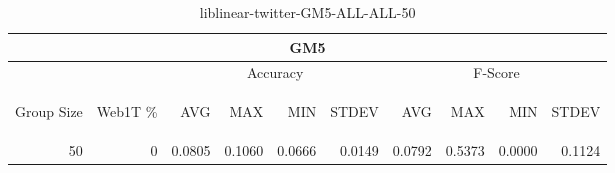 \begin{center}
\begin{table}[htbp] 
 \begin{center}
\begin{tabular}{ | r | r | r | r | r | r | r | r | r | r |}
\hline
\multicolumn{10}{|c|}{GM5}\\
\hline
 & & \multicolumn{4}{|c|}{Accuracy} & \multicolumn{4}{|c|}{F-Score}\\ \cline{3-10}
\begin{sideways}Group Size\end{sideways} & \begin{sideways}Web1T \%\end{sideways} & \begin{sideways}AVG\end{sideways} & \begin{sideways}MAX\end{sideways} & \begin{sideways}MIN\end{sideways} & \begin{sideways}STDEV\end{sideways} & \begin{sideways}AVG\end{sideways} & \begin{sideways}MAX\end{sideways} & \begin{sideways}MIN\end{sideways} & \begin{sideways}STDEV\end{sideways}\\
\hline
\multirow{0}{*}{50}
 & 0 & 0.0805 & 0.1060 & 0.0666 & 0.0149 & 0.0792 & 0.5373 & 0.0000 & 0.1124\\ \cline{2-10}
\hline
\end{tabular}
\caption{liblinear-twitter-GM5-ALL-ALL-50}
\label{table:liblinear-twitter-GM5-ALL-ALL-50}
\end{center}
 \end{table}
\end{center}

